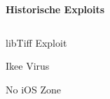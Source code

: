 \begin{frame}
	\centering
	\textbf{Historische Exploits}
	\begin{columns}[T] %
    	\begin{column}[T]{5cm} %
    		\begin{block}{}
				libTiff Exploit
			\end{block}
			\begin{block}{}
				Ikee Virus
			\end{block}
			\begin{block}{}
				No iOS Zone
			\end{block}
    	\end{column}
	\end{columns}

\end{frame}